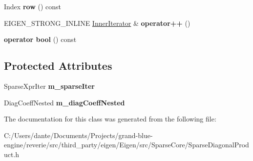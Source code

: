 \begin{DoxyCompactItemize}
\item 
\mbox{\label{class_eigen_1_1internal_1_1sparse__diagonal__product__evaluator_3_01_sparse_xpr_type_00_01_diag_f44167c623880e382ac76ec71f78299c_ada1d128324b999f9ac99c9d0578c83fa}} 
Index {\bfseries row} () const
\item 
\mbox{\label{class_eigen_1_1internal_1_1sparse__diagonal__product__evaluator_3_01_sparse_xpr_type_00_01_diag_f44167c623880e382ac76ec71f78299c_a84ce607dbf92568d6cf7cac7b4647e46}} 
E\+I\+G\+E\+N\+\_\+\+S\+T\+R\+O\+N\+G\+\_\+\+I\+N\+L\+I\+NE \mbox{\hyperlink{class_eigen_1_1_inner_iterator}{Inner\+Iterator}} \& {\bfseries operator++} ()
\item 
\mbox{\label{class_eigen_1_1internal_1_1sparse__diagonal__product__evaluator_3_01_sparse_xpr_type_00_01_diag_f44167c623880e382ac76ec71f78299c_ac40c3dd7c6a364a9b8ac44c031400943}} 
{\bfseries operator bool} () const
\end{DoxyCompactItemize}
\subsection*{Protected Attributes}
\begin{DoxyCompactItemize}
\item 
\mbox{\label{class_eigen_1_1internal_1_1sparse__diagonal__product__evaluator_3_01_sparse_xpr_type_00_01_diag_f44167c623880e382ac76ec71f78299c_aa02f9bd53f7501b07ae533a75282385b}} 
Sparse\+Xpr\+Iter {\bfseries m\+\_\+sparse\+Iter}
\item 
\mbox{\label{class_eigen_1_1internal_1_1sparse__diagonal__product__evaluator_3_01_sparse_xpr_type_00_01_diag_f44167c623880e382ac76ec71f78299c_a9c5330655f796c2094d9b3ea933999b1}} 
Diag\+Coeff\+Nested {\bfseries m\+\_\+diag\+Coeff\+Nested}
\end{DoxyCompactItemize}


The documentation for this class was generated from the following file\+:\begin{DoxyCompactItemize}
\item 
C\+:/\+Users/dante/\+Documents/\+Projects/grand-\/blue-\/engine/reverie/src/third\+\_\+party/eigen/\+Eigen/src/\+Sparse\+Core/Sparse\+Diagonal\+Product.\+h\end{DoxyCompactItemize}

